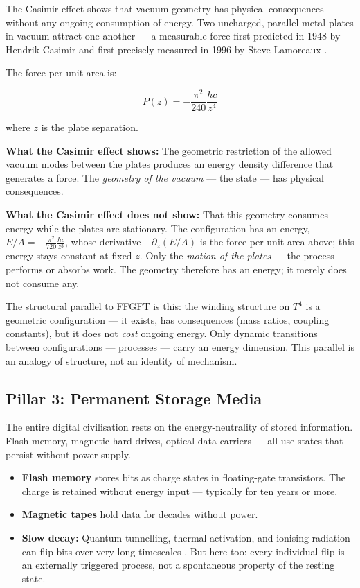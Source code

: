 The Casimir effect shows that vacuum geometry has physical consequences
without any ongoing consumption of energy. Two uncharged, parallel
metal plates in vacuum attract one another — a measurable force first
predicted in 1948 by Hendrik Casimir \cite{Casimir1948} and first
precisely measured in 1996 by Steve Lamoreaux \cite{Lamoreaux1997}.

The force per unit area is:

\begin{equation}
  P(z) = -\frac{\pi^2}{240}\frac{\hbar c}{z^4}
\end{equation}

where $z$ is the plate separation.

\textbf{What the Casimir effect shows:} The geometric restriction of
the allowed vacuum modes between the plates produces an energy density
difference that generates a force. The \emph{geometry of the vacuum}
— the state — has physical consequences.

\textbf{What the Casimir effect does not show:} That this geometry
consumes energy while the plates are stationary. The configuration has an
energy, $E/A = -\frac{\pi^2}{720}\frac{\hbar c}{z^3}$, whose derivative
$-\partial_z(E/A)$ is the force per unit area above; this energy stays
constant at fixed $z$. Only the
\emph{motion of the plates} — the process — performs or absorbs work.
The geometry therefore has an energy; it merely does not consume any.

The structural parallel to FFGFT is this: the winding structure on $T^4$ is a
geometric configuration — it exists, has consequences (mass ratios,
coupling constants), but it does not \emph{cost} ongoing energy. Only
dynamic transitions between configurations — processes — carry an energy
dimension. This parallel is an analogy of structure, not an identity of
mechanism.

\subsection{Pillar 3: Permanent Storage Media}

The entire digital civilisation rests on the energy-neutrality of stored
information. Flash memory, magnetic hard drives, optical data carriers —
all use states that persist without power supply.

\begin{itemize}
  \item \textbf{Flash memory} stores bits as charge states in
        floating-gate transistors. The charge is retained without energy
        input — typically for ten years or more.
  \item \textbf{Magnetic tapes} hold data for decades without power.
  \item \textbf{Slow decay:} Quantum tunnelling, thermal activation,
        and ionising radiation can flip bits over very long timescales
        \cite{Bez2003}. But here too: every individual flip is an
        externally triggered process, not a spontaneous property of
        the resting state.
\end{itemize}

